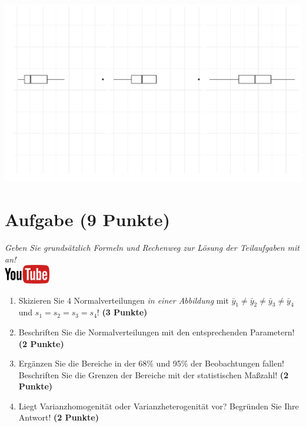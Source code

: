 \documentclass[a4paper, 9pt]{scrartcl}\usepackage[]{graphicx}\usepackage[]{xcolor}
\makeatletter
\def\maxwidth{ %
  \ifdim\Gin@nat@width>\linewidth
    \linewidth
  \else
    \Gin@nat@width
  \fi
}
\makeatother
\begin{document}
{\centering \includegraphics[width=\maxwidth]{img/desc-stat-11-1} 

}




 
\clearpage

\section{Aufgabe \hfill (9 Punkte)}

\textit{Geben Sie grunds{\"a}tzlich Formeln und Rechenweg zur L{\"o}sung der
  Teilaufgaben mit an!} \\[1Ex]

\hfill\href{https://youtu.be/ZrJhn2wPbq4}{\includegraphics[width =
  2cm]{img/youtube}}\\[1Ex]



\begin{enumerate}
\item Skizieren Sie $4$ Normalverteilungen \textit{in einer
    Abbildung} mit $\bar{y}_1 \neq \bar{y}_2 \neq \bar{y}_3 \neq \bar{y}_4$ und $s_1 = s_2 = s_3 = s_4$! \textbf{(3 Punkte)}
\item Beschriften Sie die Normalverteilungen mit den entsprechenden
  Parametern! \textbf{(2 Punkte)}
\item Erg{\"a}nzen Sie die Bereiche in der 68\% und 95\% der Beobachtungen
  fallen! Beschriften Sie die Grenzen der Bereiche mit der statistischen Ma{\ss}zahl! \textbf{(2 Punkte)}
\item Liegt Varianzhomogenit{\"a}t oder Varianzheterogenit{\"a}t vor? Begr{\"u}nden Sie
  Ihre Antwort! \textbf{(2 Punkte)}
\end{enumerate}
\end{document}
